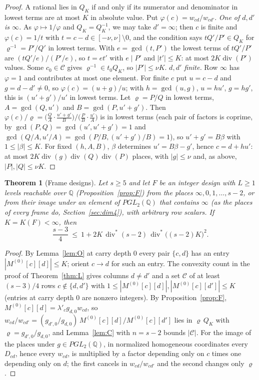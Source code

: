 \documentclass[11pt]{amsart}
\newtheorem{theorem}{Theorem}
\theoremstyle{definition}
\theoremstyle{plain}
\begin{document}
\begin{proof}
A rational lies in $Q_K$ if and only if its numerator and denominator in lowest terms are at most $K$ in absolute value. Put $\varphi(c)=w_{cd}/w_{cd'}$.
\emph{One of $d,d'$ is $\infty$.} As $\varphi\mapsto1/\varphi$ and $Q_K=Q_K^{-1}$, we may take $d'=\infty$; then $c$ is finite and $\varphi(c)=1/t$ with $t=c-d\in[-\nu,\nu]\setminus0$, and the condition says $tQ'/P'\in Q_K$ for $\varrho^{-1}=P'/Q'$ in lowest terms. With $e=\gcd(t,P')$ the lowest terms of $tQ'/P'$ are $(tQ'/e)/(P'/e)$, so $t=et'$ with $e\mid P'$ and $|t'|\le K$: at most $2K\operatorname{div}(P')$ values. Some $c_0\in\mathcal C$ gives $\varrho^{-1}\in t_0Q_K$, so $|P'|\le \nu K$.
\emph{$d,d'$ finite.} Row $\infty$ has $\varphi=1$ and contributes at most one element. For finite $c$ put $u=c-d$ and $g=d-d'\ne0$, so $\varphi(c)=(u+g)/u$; with $h=\gcd(u,g)$, $u=hu'$, $g=hg'$, this is $(u'+g')/u'$ in lowest terms. Let $\varrho=P/Q$ in lowest terms, $A=\gcd(Q,u')$ and $B=\gcd(P,u'+g')$. Then $\varphi(c)/\varrho=\bigl(\frac QA\cdot\frac{u'+g'}B\bigr)\big/\bigl(\frac PB\cdot\frac{u'}A\bigr)$ is in lowest terms (each pair of factors is coprime, by $\gcd(P,Q)=\gcd(u',u'+g')=1$ and $\gcd(Q/A,u'/A)=\gcd(P/B,(u'+g')/B)=1$), so $u'+g'=B\beta$ with $1\le|\beta|\le K$. For fixed $(h,A,B)$, $\beta$ determines $u'=B\beta-g'$, hence $c=d+hu'$: at most $2K\operatorname{div}(g)\operatorname{div}(Q)\operatorname{div}(P)$ places, with $|g|\le \nu$ and, as above, $|P|,|Q|\le \nu K$.
\end{proof}

\begin{theorem}[Frame designs]\label{thm:Lstar}
Let $s\ge5$ and let $F$ be an integer design with $L\ge1$ levels reachable over $\mathbb Q$ (Proposition~\ref{prop:F}) from the places $\infty,0,1,\dots,s-2$, or from their image under an element of $PGL_2(\mathbb Q)$ that contains $\infty$ (as the places of every frame do, Section~\ref{sec:dim4}), with arbitrary row scalars. If $K=K(F)<\infty$, then
\[
\frac{s-3}4\ \le\ 1+2K\,\operatorname{div}^*(s-2)\,\operatorname{div}^*\bigl((s-2)K\bigr)^2 .
\]
\end{theorem}

\begin{proof}
By Lemma~\ref{lem:O} at carry depth $0$ every pair $\{c,d\}$ has an entry $|M^{(0)}[c][d]|\le K$; orient $c\to d$ for such an entry. The convexity count in the proof of Theorem~\ref{thm:L} gives columns $d\ne d'$ and a set $\mathcal C$ of at least $(s-3)/4$ rows $c\notin\{d,d'\}$ with $1\le|M^{(0)}[c][d]|,|M^{(0)}[c][d']|\le K$ (entries at carry depth $0$ are nonzero integers). By Proposition~\ref{prop:F}, $M^{(0)}[c][d]=\lambda'_cg_{d,0}w_{cd}$, so $w_{cd}/w_{cd'}=(g_{d',0}/g_{d,0})\,M^{(0)}[c][d]/M^{(0)}[c][d']$ lies in $\varrho\,Q_K$ with $\varrho=g_{d',0}/g_{d,0}$, and Lemma~\ref{lem:C} with $n=s-2$ bounds $|\mathcal C|$. For the image of the places under $g\in PGL_2(\mathbb Q)$, in normalized homogeneous coordinates every $D_{cd}$, hence every $w_{cd}$, is multiplied by a factor depending only on $c$ times one depending only on $d$; the first cancels in $w_{cd}/w_{cd'}$ and the second changes only $\varrho$.
\end{proof}
\end{document}
